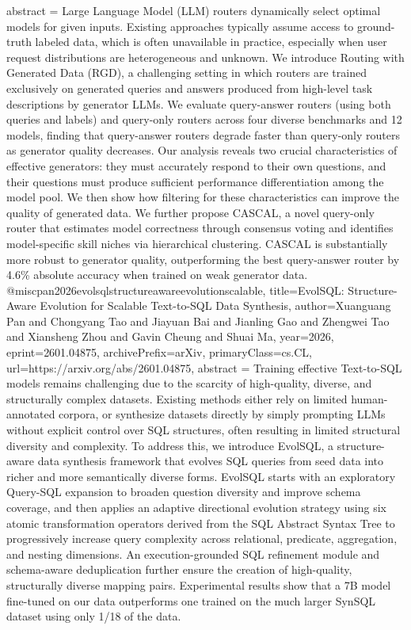 {      abstract = {Large Language Model (LLM) routers dynamically select optimal models for given inputs. Existing approaches typically assume access to ground-truth labeled data, which is often unavailable in practice, especially when user request distributions are heterogeneous and unknown. We introduce Routing with Generated Data (RGD), a challenging setting in which routers are trained exclusively on generated queries and answers produced from high-level task descriptions by generator LLMs. We evaluate query-answer routers (using both queries and labels) and query-only routers across four diverse benchmarks and 12 models, finding that query-answer routers degrade faster than query-only routers as generator quality decreases. Our analysis reveals two crucial characteristics of effective generators: they must accurately respond to their own questions, and their questions must produce sufficient performance differentiation among the model pool. We then show how filtering for these characteristics can improve the quality of generated data. We further propose CASCAL, a novel query-only router that estimates model correctness through consensus voting and identifies model-specific skill niches via hierarchical clustering. CASCAL is substantially more robust to generator quality, outperforming the best query-answer router by 4.6\% absolute accuracy when trained on weak generator data.}
}@misc{pan2026evolsqlstructureawareevolutionscalable,
      title={EvolSQL: Structure-Aware Evolution for Scalable Text-to-SQL Data Synthesis}, 
      author={Xuanguang Pan and Chongyang Tao and Jiayuan Bai and Jianling Gao and Zhengwei Tao and Xiansheng Zhou and Gavin Cheung and Shuai Ma},
      year={2026},
      eprint={2601.04875},
      archivePrefix={arXiv},
      primaryClass={cs.CL},
      url={https://arxiv.org/abs/2601.04875},
      abstract = {Training effective Text-to-SQL models remains challenging due to the scarcity of high-quality, diverse, and structurally complex datasets. Existing methods either rely on limited human-annotated corpora, or synthesize datasets directly by simply prompting LLMs without explicit control over SQL structures, often resulting in limited structural diversity and complexity. To address this, we introduce EvolSQL, a structure-aware data synthesis framework that evolves SQL queries from seed data into richer and more semantically diverse forms. EvolSQL starts with an exploratory Query-SQL expansion to broaden question diversity and improve schema coverage, and then applies an adaptive directional evolution strategy using six atomic transformation operators derived from the SQL Abstract Syntax Tree to progressively increase query complexity across relational, predicate, aggregation, and nesting dimensions. An execution-grounded SQL refinement module and schema-aware deduplication further ensure the creation of high-quality, structurally diverse mapping pairs. Experimental results show that a 7B model fine-tuned on our data outperforms one trained on the much larger SynSQL dataset using only 1/18 of the data.}
}
